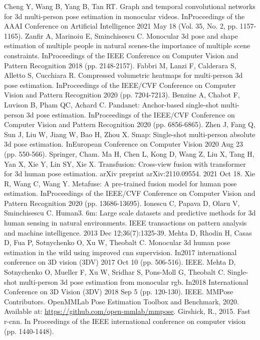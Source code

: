 \documentclass[runningheads]{llncs}
\begin{document}
\begin{thebibliography}{8}
   Cheng Y, Wang B, Yang B, Tan RT. Graph and temporal convolutional networks for 3d multi-person pose estimation in monocular videos. InProceedings of the AAAI Conference on Artificial Intelligence 2021 May 18 (Vol. 35, No. 2, pp. 1157-1165).
   Zanfir A, Marinoiu E, Sminchisescu C. Monocular 3d pose and shape estimation of multiple people in natural scenes-the importance of multiple scene constraints. InProceedings of the IEEE Conference on Computer Vision and Pattern Recognition 2018 (pp. 2148-2157).
   Fabbri M, Lanzi F, Calderara S, Alletto S, Cucchiara R. Compressed volumetric heatmaps for multi-person 3d pose estimation. InProceedings of the IEEE/CVF Conference on Computer Vision and Pattern Recognition 2020 (pp. 7204-7213).
   Benzine A, Chabot F, Luvison B, Pham QC, Achard C. Pandanet: Anchor-based single-shot multi-person 3d pose estimation. InProceedings of the IEEE/CVF Conference on Computer Vision and Pattern Recognition 2020 (pp. 6856-6865).
   Zhen J, Fang Q, Sun J, Liu W, Jiang W, Bao H, Zhou X. Smap: Single-shot multi-person absolute 3d pose estimation. InEuropean Conference on Computer Vision 2020 Aug 23 (pp. 550-566). Springer, Cham.
   Ma H, Chen L, Kong D, Wang Z, Liu X, Tang H, Yan X, Xie Y, Lin SY, Xie X. Transfusion: Cross-view fusion with transformer for 3d human pose estimation. arXiv preprint arXiv:2110.09554. 2021 Oct 18.
   Xie R, Wang C, Wang Y. Metafuse: A pre-trained fusion model for human pose estimation. InProceedings of the IEEE/CVF Conference on Computer Vision and Pattern Recognition 2020 (pp. 13686-13695).
   Ionescu C, Papava D, Olaru V, Sminchisescu C. Human3. 6m: Large scale datasets and predictive methods for 3d human sensing in natural environments. IEEE transactions on pattern analysis and machine intelligence. 2013 Dec 12;36(7):1325-39.
   Mehta D, Rhodin H, Casas D, Fua P, Sotnychenko O, Xu W, Theobalt C. Monocular 3d human pose estimation in the wild using improved cnn supervision. In2017 international conference on 3D vision (3DV) 2017 Oct 10 (pp. 506-516). IEEE.
   Mehta D, Sotnychenko O, Mueller F, Xu W, Sridhar S, Pons-Moll G, Theobalt C. Single-shot multi-person 3d pose estimation from monocular rgb. In2018 International Conference on 3D Vision (3DV) 2018 Sep 5 (pp. 120-130). IEEE.
   MMPose Contributors. OpenMMLab Pose Estimation Toolbox and Benchmark, 2020. Available at: \url{https://github.com/open-mmlab/mmpose}.
   Girshick, R., 2015. Fast r-cnn. In Proceedings of the IEEE international conference on computer vision (pp. 1440-1448).



\end{thebibliography}
\end{document}
